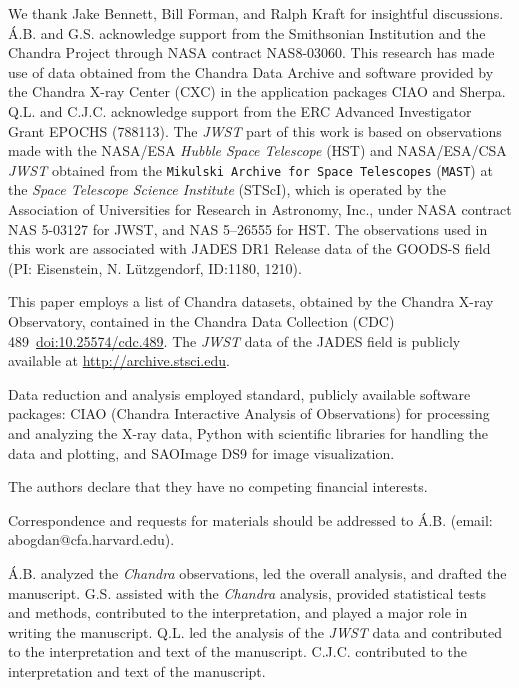 \documentclass[pdflatex,sn-mathphys-num]{sn-jnl}
\theoremstyle{thmstyleone}
\theoremstyle{thmstyletwo}
\theoremstyle{thmstylethree}
\begin{document}
\setcounter{figure}{0}
\newpage

We thank Jake Bennett, Bill Forman, and Ralph Kraft for insightful discussions. \'A.B. and G.S. acknowledge support from the Smithsonian Institution and the Chandra Project through NASA contract NAS8-03060. This research has made use of data obtained from the Chandra Data Archive and software provided by the Chandra X-ray Center (CXC) in the application packages CIAO and Sherpa.
Q.L. and C.J.C. acknowledge support from the ERC Advanced Investigator Grant EPOCHS (788113). The \textit{JWST} part of this work is based on observations made with the NASA/ESA \textit{Hubble Space Telescope} (HST) and NASA/ESA/CSA \textit{JWST} obtained from the \texttt{Mikulski Archive for Space Telescopes} (\texttt{MAST}) at the \textit{Space Telescope Science Institute} (STScI), which is operated by the Association of Universities for Research in Astronomy, Inc., under NASA contract NAS 5-03127 for JWST, and NAS 5–26555 for HST. The observations used in this work are associated with JADES DR1 Release data of the GOODS-S field (PI: Eisenstein, N. Lützgendorf, ID:1180, 1210).


 This paper employs a list of Chandra datasets, obtained by the Chandra X-ray Observatory, contained in the Chandra Data Collection (CDC) 489~\href{https://doi.org/10.25574/cdc.489}{doi:10.25574/cdc.489}.
The \textit{JWST} data of the JADES field is publicly available at \url{http://archive.stsci.edu}.

 Data reduction and analysis employed standard, publicly available software packages: CIAO (Chandra Interactive Analysis of Observations) for processing and analyzing the X-ray data, Python with scientific libraries for handling the data and plotting, and SAOImage DS9 for image visualization.


 The authors declare that they have no competing financial interests.

  Correspondence and requests for materials should be addressed to \'A.B. (email: abogdan@cfa.harvard.edu).

 \'A.B. analyzed the \textit{Chandra} observations, led the overall analysis, and drafted the manuscript. G.S. assisted with the \textit{Chandra} analysis, provided statistical tests and methods, contributed to the interpretation, and played a major role in writing the manuscript. Q.L. led the analysis of the \textit{JWST} data and contributed to the interpretation and text of the manuscript. C.J.C. contributed to the interpretation and text of the manuscript.
\end{document}
